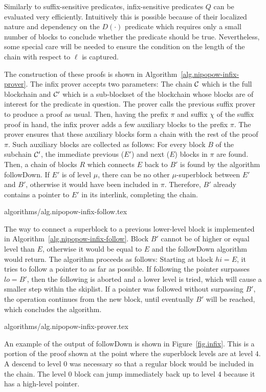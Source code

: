 Similarly to suffix-sensitive predicates, infix-sensitive predicates $Q$ can be evaluated very efficiently. Intuitively this is possible because
of their localized nature and dependency on the $D(\cdot)$ predicate which
requires only a small number of blocks to conclude whether the predicate should
be true. Nevertheless, some special care will be needed to ensure the condition
on the length  of the chain with respect to $\ell$ is captured.

The construction of these proofs is shown in
Algorithm~\ref{alg.nipopow-infix-prover}. The infix prover accepts two
parameters: The chain $\mathcal{C}$ which is the full blockchain and $\mathcal{C}'$ which
is a sub-blockset of the blockchain whose blocks are of interest for the
predicate in question. The prover calls the previous suffix prover to produce a
proof as usual. Then, having the prefix $\pi$ and suffix $\chi$ of the suffix
proof in hand, the infix prover adds a few auxiliary blocks to the prefix $\pi$.
The prover ensures that these auxiliary blocks form a chain with the rest of the
proof $\pi$. Such auxiliary blocks are collected as follows: For every block $B$
of the subchain $\mathcal{C}'$, the immediate previous ($E'$) and next ($E$) blocks
in $\pi$ are found. Then, a chain of blocks $R$ which connects $E$ back to $B'$
is found by the algorithm followDown. If $E'$ is of level $\mu$, there can be no
other $\mu$-superblock between $E'$ and $B'$, otherwise it would have been
included in $\pi$. Therefore, $B'$ already contains a pointer to $E'$ in its
interlink, completing the chain.

{algorithms/alg.nipopow-infix-follow.tex}

The way to connect a superblock to a previous lower-level block is implemented
in Algorithm~\ref{alg.nipopow-infix-follow}.  Block $B'$ cannot be of higher or
equal level than $E$, otherwise it would be equal to $E$ and the followDown
algorithm would return. The algorithm proceeds as follows: Starting at block $hi =
E$, it tries to follow a pointer to as far as possible. If following the pointer
surpasses $lo = B'$, then the following is aborted and a lower level is tried,
which will cause a smaller step within the skiplist. If a pointer was followed
without surpassing $B'$, the operation continues from the new block, until
eventually $B'$ will be reached, which concludes the algorithm.

{algorithms/alg.nipopow-infix-prover.tex}

An example of the output of followDown is shown in Figure~\ref{fig.infix}. This
is a portion of the proof shown at the point where the superblock levels are at
level $4$. A descend to level $0$ was necessary so that a regular block would be
included in the chain. The level $0$ block can jump immediately back up to level
$4$ because it has a high-level pointer.

